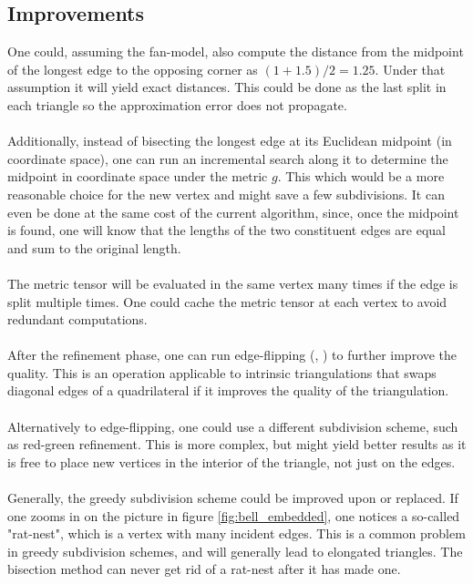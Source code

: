 \subsection*{Improvements}
One could, assuming the fan-model, also compute the distance from the midpoint of the longest edge to the opposing corner as $(1 + 1.5) / 2 = 1.25$. Under that assumption it will yield exact distances. This could be done as the last split in each triangle so the approximation error does not propagate.
\\\\ Additionally, instead of bisecting the longest edge at its Euclidean midpoint (in coordinate space), one can run an incremental search along it to determine the midpoint in coordinate space under the metric $g$. This which would be a more reasonable choice for the new vertex and might save a few subdivisions. It can even be done at the same cost of the current algorithm, since, once the midpoint is found, one will know that the lengths of the two constituent edges are equal and sum to the original length.
\\\\ The metric tensor will be evaluated in the same vertex many times if the edge is split multiple times. One could cache the metric tensor at each vertex to avoid redundant computations.
\\\\ After the refinement phase, one can run edge-flipping (\cite{sharp2021intrinsic}, \cite{intrinsic_laplacian}) to further improve the quality. This is an operation applicable to intrinsic triangulations that swaps diagonal edges of a quadrilateral if it improves the quality of the triangulation.
\\\\ Alternatively to edge-flipping, one could use a different subdivision scheme, such as red-green refinement. This is more complex, but might yield better results as it is free to place new vertices in the interior of the triangle, not just on the edges.
\\\\ Generally, the greedy subdivision scheme could be improved upon or replaced. If one zooms in on the picture in figure \ref{fig:bell_embedded}, one notices a so-called "rat-nest", which is a vertex with many incident edges. This is a common problem in greedy subdivision schemes, and will generally lead to elongated triangles. The bisection method can never get rid of a rat-nest after it has made one.

\ifdefined\COMPILINGFROMMAIN
\else
    
\fi